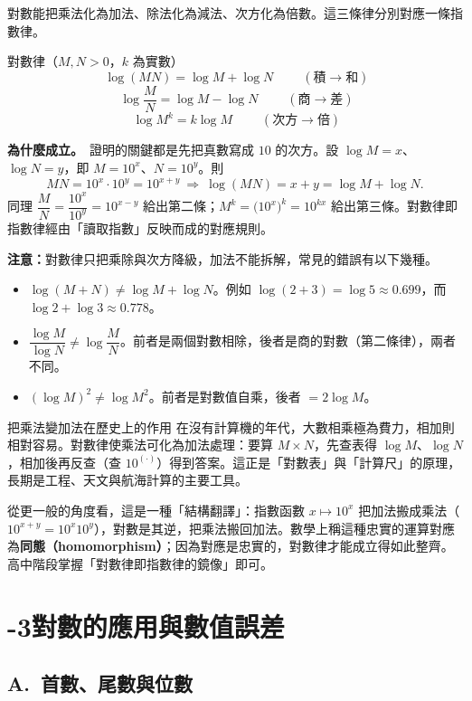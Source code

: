 \documentclass[11pt]{article}
\begin{document}
對數能把乘法化為加法、除法化為減法、次方化為倍數。這三條律分別對應一條指數律。

\begin{補充框}{對數律（$M,N>0$，$k$ 為實數）}
$$\boxed{\;\log(MN)=\log M+\log N\;}\qquad(\text{積} \to \text{和})$$
$$\boxed{\;\log\frac{M}{N}=\log M-\log N\;}\qquad(\text{商} \to \text{差})$$
$$\boxed{\;\log M^{k}=k\log M\;}\qquad(\text{次方} \to \text{倍})$$

\textbf{為什麼成立。}\ 證明的關鍵都是先把真數寫成 $10$ 的次方。設 $\log M=x$、$\log N=y$，即 $M=10^x$、$N=10^y$。則
$$MN=10^x\cdot10^y=10^{x+y}\ \Longrightarrow\ \log(MN)=x+y=\log M+\log N.$$
同理 $\dfrac MN=\dfrac{10^x}{10^y}=10^{x-y}$ 給出第二條；$M^k=\big(10^x\big)^k=10^{kx}$ 給出第三條。對數律即指數律經由「讀取指數」反映而成的對應規則。
\end{補充框}

\textbf{注意：}對數律只把乘除與次方降級，加法不能拆解，常見的錯誤有以下幾種。

\begin{itemize}\setlength{\itemsep}{1pt}
\item $\log(M+N)\ne\log M+\log N$。例如 $\log(2+3)=\log5\approx0.699$，而 $\log2+\log3\approx0.778$。
\item $\dfrac{\log M}{\log N}\ne\log\dfrac{M}{N}$。前者是兩個對數相除，後者是商的對數（第二條律），兩者不同。
\item $(\log M)^2\ne\log M^2$。前者是對數值自乘，後者 $=2\log M$。
\end{itemize}

\begin{延伸框}{把乘法變加法在歷史上的作用}
在沒有計算機的年代，大數相乘極為費力，相加則相對容易。對數律使乘法可化為加法處理：要算 $M\times N$，先查表得 $\log M$、$\log N$，相加後再反查（查 $10^{(\cdot)}$）得到答案。這正是「對數表」與「計算尺」的原理，長期是工程、天文與航海計算的主要工具。

從更一般的角度看，這是一種「結構翻譯」：指數函數 $x\mapsto10^x$ 把加法搬成乘法（$10^{x+y}=10^x10^y$），對數是其逆，把乘法搬回加法。數學上稱這種忠實的運算對應為\textbf{同態（homomorphism）}；因為對應是忠實的，對數律才能成立得如此整齊。高中階段掌握「對數律即指數律的鏡像」即可。
\end{延伸框}

\section*{-3\quad 對數的應用與數值誤差}

\subsection*{\sffamily A.\ 首數、尾數與位數}
\end{document}
